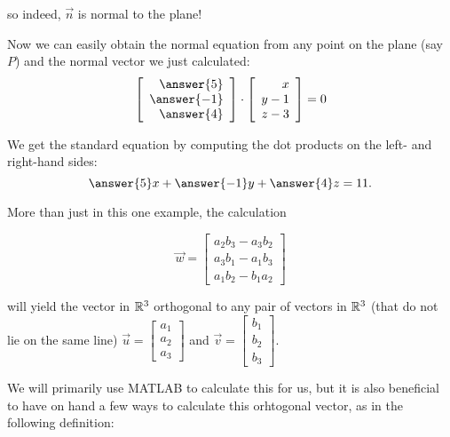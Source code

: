 \documentclass{ximera}
\begin{document}
\begin{example}
    so indeed, $\vec{n}$ is normal to the plane!

 

    Now we can easily obtain the normal equation from any point on the
    plane (say $P$) and the normal vector we just calculated:
    \begin{equation*}
      \startmat{r}\answer{5} \\ \answer{-1} \\ \answer{4} \stopmat
      \cdot
      \startmat{r} x \\ y-1 \\ z-3 \stopmat
      =
      0
    \end{equation*}




    We get the standard equation by computing the dot products on the
    left- and right-hand sides:
    \begin{equation*}
      \answer{5}x +\answer{-1} y + \answer{4}z = 11.
    \end{equation*}

  \end{example}

  More than just in this one example, the calculation 

  
  $$\vec{w}=\begin{bmatrix}
      a_2b_3-a_3b_2\\a_3b_1-a_1b_3\\a_1b_2-b_1a_2
    \end{bmatrix}$$

  will yield the vector in $\mathbb{R}^3$ orthogonal to any pair of vectors in $\mathbb{R}^3$ (that do not lie on the same line) $\vec{u}=\begin{bmatrix}
      a_1\\a_2\\a_3
    \end{bmatrix}$ and $\vec{v}=\begin{bmatrix}
      b_1\\b_2\\b_3
    \end{bmatrix}$.

   

  We will primarily use MATLAB to calculate this for us, but it is also beneficial to have on hand a few ways to calculate this orhtogonal vector, as in the following definition:
 
\end{document}
